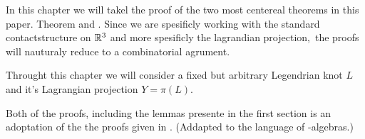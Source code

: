 In this chapter we will takel the proof of the two most centereal theorems in
this paper. Theorem  and . 
Since we are spesificly working with the standard contactstructure on $\mathbb{R}^3$ and
more spesificly the lagrandian projection, the proofs will nauturaly reduce to a
combinatorial agrument.

Throught this chapter we will consider a fixed but arbitrary Legendrian knot
$L$ and it's Lagrangian projection $Y = \pi(L)$.

Both of the proofs, including the lemmas presente in the first section is an
adoptation of the the proofs given in \cite{chekanov02}. (Addapted to the
language of \Ainf-algebras.)
